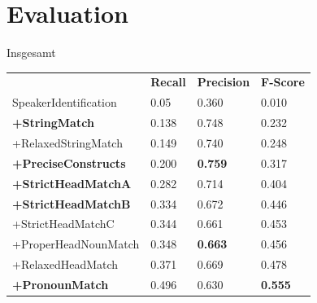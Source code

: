 \documentclass[11pt,a4paper]{beamer}
\begin{document}
\section{Evaluation}
\begin{frame}{Insgesamt}
\begin{table}[h]
\begin{tabular}{llll}
                            & \textbf{Recall} & \textbf{Precision} & \textbf{F-Score} \\
SpeakerIdentification       & 0.05            & 0.360              & 0.010            \\
\textbf{+StringMatch}       & 0.138           & 0.748              & 0.232            \\
+RelaxedStringMatch         & 0.149           & 0.740              & 0.248            \\
\textbf{+PreciseConstructs} & 0.200           & \textbf{0.759}     & 0.317            \\
\textbf{+StrictHeadMatchA}  & 0.282           & 0.714              & 0.404            \\
\textbf{+StrictHeadMatchB}  & 0.334           & 0.672              & 0.446            \\
+StrictHeadMatchC           & 0.344           & 0.661              & 0.453            \\
+ProperHeadNounMatch        & 0.348           & \textbf{0.663}     & 0.456            \\
+RelaxedHeadMatch           & 0.371           & 0.669              & 0.478            \\
\textbf{+PronounMatch}      & 0.496           & 0.630              & \textbf{0.555}       
\end{tabular}
\end{table}
\end{frame}
\end{document}
